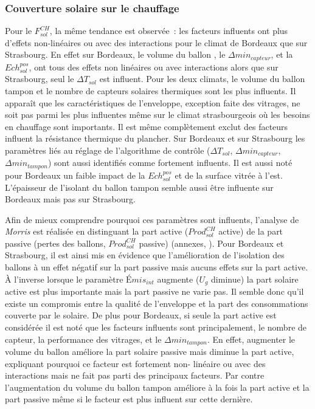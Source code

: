 \subsubsection{Couverture solaire sur le chauffage} %
\label{ssub:couverture_solaire_sur_le_chauffage}
Pour le $F_{sol}^{CH}$, la même tendance est observée~: les facteurs influents ont plus
d’effets non-linéaires ou avec des interactions pour le climat de Bordeaux que sur
Strasbourg. En effet sur Bordeaux, le volume du ballon , le $\Delta
min_{capteur}$, et la $Ech_{sol}^{pos}$, ont tous des effets non linéaires ou avec
interactions alors que sur Strasbourg, seul le $\Delta T_{sol}$ est influent. Pour les
deux climats, le volume du ballon tampon et le nombre de capteurs solaires thermiques sont
les plus influents. Il apparaît que les caractéristiques de l’enveloppe, exception faite
des vitrages, ne soit pas parmi les plus influentes même sur le climat strasbourgeois où
les besoins en chauffage sont importants. Il est même complètement exclut des facteurs
influent la résistance thermique du plancher. Sur Bordeaux et sur Strasbourg les
paramètres liés au réglage de l’algorithme de contrôle ($\Delta T_{sol}$, $\Delta
min_{capteur}$, $\Delta min_{tampon}$) sont aussi identifiés comme fortement influents. Il
est aussi noté pour Bordeaux un faible impact de la $Ech_{sol}^{pos}$ et de la surface
vitrée à l’est. L’épaisseur de l’isolant du ballon tampon semble aussi être influente sur
Bordeaux mais pas sur Strasbourg.

Afin de mieux comprendre pourquoi ces paramètres sont influents, l’analyse de
\textit{Morris} est réalisée en distinguant la part active ($Prod_{sol}^{CH}$ active) de
la part passive (pertes des ballons, $Prod_{sol}^{CH}$ passive) (annexes,
). Pour Bordeaux et Strasbourg, il est ainsi mis en
évidence que l’amélioration de l’isolation des ballons à un effet négatif sur la part
passive mais aucuns effets sur la part active. À l’inverse lorsque le paramètre
$Émis_{int}$ augmente ($U_{g}$ diminue) la part solaire active est plus importante mais la
part passive ne varie pas. Il semble donc qu’il existe un compromis entre la qualité de
l’enveloppe et la part des consommations couverte par le solaire. De plus pour Bordeaux,
si seule la part active est considérée il est noté que les facteurs influents sont
principalement, le nombre de capteur, la performance des vitrages, et le $\Delta
min_{tampon}$. En effet, augmenter le volume du ballon  améliore la part solaire
passive mais diminue la part active, expliquant pourquoi ce facteur est fortement non-
linéaire ou avec des interactions mais ne fait pas parti des principaux facteurs. Par
contre l’augmentation du volume du ballon tampon améliore à la fois la part active et la
part passive même si le facteur est plus influent sur cette dernière.


